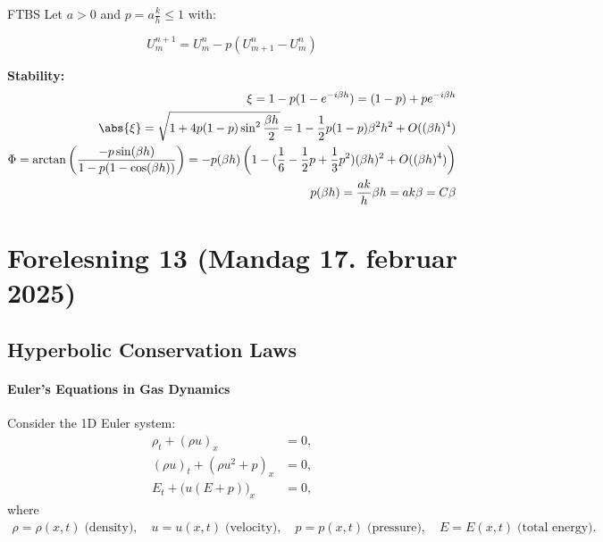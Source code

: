 \begin{example}{FTBS}{}
  Let \(a > 0\) and \(p = a \frac{k}{h} \leq 1\) with:

  \[
    U_m^{n+1} = U_m^n - p(U_{m+1}^n - U_m^n)
  \]

  \textbf{Stability:}
  \begin{align*}
    \xi = 1 - p(1 - e^{-i\beta h}) = (1 - p) + pe^{-i\beta h}                                                                                                                        \\
    \abs{\xi} = \sqrt{1 + 4p(1-p)\sin^2\frac{\beta h}{2}} = 1 - \frac{1}{2}p(1-p)\beta^2 h^2 + O((\beta h)^4)                                                                        \\
    \Phi = \arctan\left(\frac{-p\sin(\beta h)}{1-p(1-\cos(\beta h))}\right) = -p (\beta h)\left(1 - (\frac{1}{6} - \frac{1}{2}p + \frac{1}{3}p^2)(\beta h)^2 + O((\beta h)^4)\right) \\
    p (\beta h) = \frac{a k}{h} \beta h = a k \beta = C \beta
  \end{align*}

\end{example}
\section{Forelesning 13 (Mandag 17. februar 2025)}

\subsection{Hyperbolic Conservation Laws}

\paragraph{Euler's Equations in Gas Dynamics}
Consider the 1D Euler system:
\begin{align*}
  \rho_t + (\rho u)_x           & = 0, \\
  (\rho u)_t + (\rho u^2 + p)_x & = 0, \\
  E_t + \bigl(u(E + p)\bigr)_x  & = 0,
\end{align*}
where
\begin{align*}
  \rho = \rho(x,t) \; \text{(density)},\quad
  u = u(x,t) \; \text{(velocity)},\quad
  p = p(x,t) \; \text{(pressure)},\quad
  E = E(x,t) \; \text{(total energy)}.
\end{align*}

